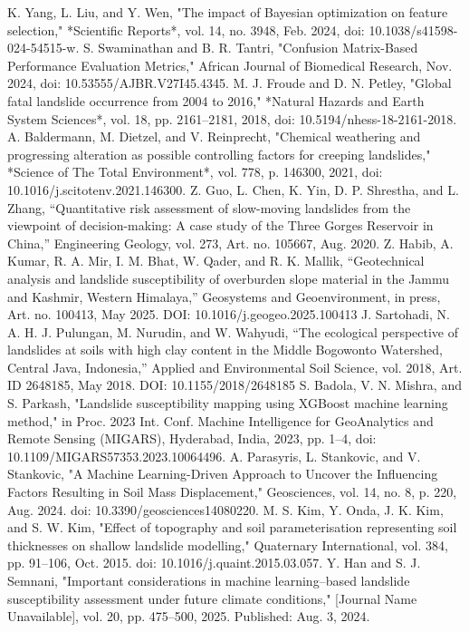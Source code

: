 \documentclass[conference]{IEEEtran}
\begin{document}
\begin{thebibliography}{00}
 K. Yang, L. Liu, and Y. Wen, "The impact of Bayesian optimization on feature selection," *Scientific Reports*, vol. 14, no. 3948, Feb. 2024, doi: 10.1038/s41598-024-54515-w.
 S. Swaminathan and B. R. Tantri, "Confusion Matrix-Based Performance Evaluation Metrics," African Journal of Biomedical Research, Nov. 2024, doi: 10.53555/AJBR.V27I45.4345.
 M. J. Froude and D. N. Petley, "Global fatal landslide occurrence from 2004 to 2016," *Natural Hazards and Earth System Sciences*, vol. 18, pp. 2161–2181, 2018, doi: 10.5194/nhess-18-2161-2018.
 A. Baldermann, M. Dietzel, and V. Reinprecht, "Chemical weathering and progressing alteration as possible controlling factors for creeping landslides," *Science of The Total Environment*, vol. 778, p. 146300, 2021, doi: 10.1016/j.scitotenv.2021.146300.
 Z. Guo, L. Chen, K. Yin, D. P. Shrestha, and L. Zhang, “Quantitative risk assessment of slow-moving landslides from the viewpoint of decision-making: A case study of the Three Gorges Reservoir in China,” Engineering Geology, vol. 273, Art. no. 105667, Aug. 2020.
 Z. Habib, A. Kumar, R. A. Mir, I. M. Bhat, W. Qader, and R. K. Mallik, “Geotechnical analysis and landslide susceptibility of overburden slope material in the Jammu and Kashmir, Western Himalaya,” Geosystems and Geoenvironment, in press, Art. no. 100413, May 2025. DOI: 10.1016/j.geogeo.2025.100413
 J. Sartohadi, N. A. H. J. Pulungan, M. Nurudin, and W. Wahyudi, “The ecological perspective of landslides at soils with high clay content in the Middle Bogowonto Watershed, Central Java, Indonesia,” Applied and Environmental Soil Science, vol. 2018, Art. ID 2648185, May 2018. DOI: 10.1155/2018/2648185
 S. Badola, V. N. Mishra, and S. Parkash, "Landslide susceptibility mapping using XGBoost machine learning method," in Proc. 2023 Int. Conf. Machine Intelligence for GeoAnalytics and Remote Sensing (MIGARS), Hyderabad, India, 2023, pp. 1–4, doi: 10.1109/MIGARS57353.2023.10064496.
 A. Parasyris, L. Stankovic, and V. Stankovic, "A Machine Learning-Driven Approach to Uncover the Influencing Factors Resulting in Soil Mass Displacement," Geosciences, vol. 14, no. 8, p. 220, Aug. 2024. doi: 10.3390/geosciences14080220.
 M. S. Kim, Y. Onda, J. K. Kim, and S. W. Kim, "Effect of topography and soil parameterisation representing soil thicknesses on shallow landslide modelling," Quaternary International, vol. 384, pp. 91–106, Oct. 2015. doi: 10.1016/j.quaint.2015.03.057.
 Y. Han and S. J. Semnani, "Important considerations in machine learning–based landslide susceptibility assessment under future climate conditions," [Journal Name Unavailable], vol. 20, pp. 475–500, 2025. Published: Aug. 3, 2024.
\end{thebibliography}
\end{document}
